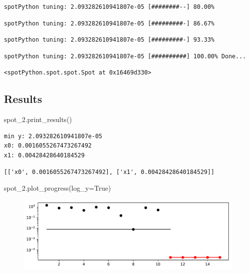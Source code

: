 \documentclass[
  letterpaper,
  DIV=11,
  numbers=noendperiod]{scrreprt}
\newenvironment{Shaded}{\begin{snugshade}}{\end{snugshade}}
\newcommand{\NormalTok}[1]{\textcolor[rgb]{0.00,0.23,0.31}{#1}}
\newcommand{\OperatorTok}[1]{\textcolor[rgb]{0.37,0.37,0.37}{#1}}
\newcommand{\VariableTok}[1]{\textcolor[rgb]{0.07,0.07,0.07}{#1}}
\begin{document}
\begin{verbatim}
spotPython tuning: 2.093282610941807e-05 [########--] 80.00% 
\end{verbatim}

\begin{verbatim}
spotPython tuning: 2.093282610941807e-05 [#########-] 86.67% 
\end{verbatim}

\begin{verbatim}
spotPython tuning: 2.093282610941807e-05 [#########-] 93.33% 
\end{verbatim}

\begin{verbatim}
spotPython tuning: 2.093282610941807e-05 [##########] 100.00% Done...
\end{verbatim}

\begin{verbatim}
<spotPython.spot.spot.Spot at 0x16469d330>
\end{verbatim}

\hypertarget{results-1}{%
\subsection{Results}\label{results-1}}

\begin{Shaded}
\begin{Highlighting}[]
\NormalTok{spot\_2.print\_results()}
\end{Highlighting}
\end{Shaded}

\begin{verbatim}
min y: 2.093282610941807e-05
x0: 0.0016055267473267492
x1: 0.00428428640184529
\end{verbatim}

\begin{verbatim}
[['x0', 0.0016055267473267492], ['x1', 0.00428428640184529]]
\end{verbatim}

\begin{Shaded}
\begin{Highlighting}[]
\NormalTok{spot\_2.plot\_progress(log\_y}\OperatorTok{=}\VariableTok{True}\NormalTok{)}
\end{Highlighting}
\end{Shaded}

\begin{figure}[H]

{\centering \includegraphics{03_spot_anisotropic_files/figure-pdf/cell-6-output-1.pdf}

}

\end{figure}
\end{document}
